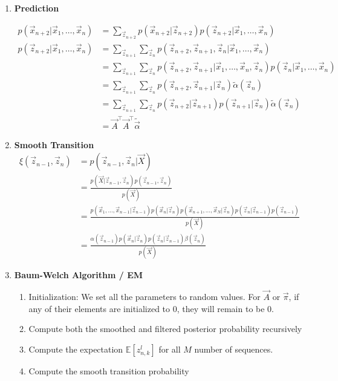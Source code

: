 \documentclass[12pt,twoside]{article}
\begin{document}
\begin{enumerate}
\item \textbf{Prediction}

	\begin{align*}
		p(\vec{x}_{n+2}\vert \vec{x}_1, \ldots, \vec{x}_n) &= \sum_{\vec{z}_{n+2}}p(\vec{x}_{n+2}\vert \vec{z}_{n+2})p(\vec{z}_{n+2}\vert \vec{x}_1,\ldots, \vec{x}_n)\\
		p(\vec{z}_{n+2}\vert \vec{x}_1,\ldots, \vec{x}_n) 
		& =  \sum_{\vec{z}_{n+1}}\sum_{\vec{z}_{n}} p(\vec{z}_{n+2},\vec{z}_{n+1},\vec{z}_{n}\vert \vec{x}_1, \ldots, \vec{x}_{n})\\
		& =  \sum_{\vec{z}_{n+1}}\sum_{\vec{z}_{n}} p(\vec{z}_{n+2},\vec{z}_{n+1} \vert \vec{x}_1, \ldots, \vec{x}_{n}, \vec{z}_{n})p(\vec{z}_{n}\vert \vec{x}_1, \ldots, \vec{x}_{n})\\
		& =  \sum_{\vec{z}_{n+1}}\sum_{\vec{z}_{n}} p(\vec{z}_{n+2},\vec{z}_{n+1} \vert \vec{z}_{n})\tilde{\alpha}(\vec{z}_n)\\
		& =  \sum_{\vec{z}_{n+1}}\sum_{\vec{z}_{n}} p(\vec{z}_{n+2}\vert \vec{z}_{n+1})p(\vec{z}_{n+1}\vert \vec{z}_{n})\tilde{\alpha}(\vec{z}_n)\\
		& = \vec{A}^\top\vec{A}^\top\tilde{\vec{\alpha}}
	\end{align*}	



\item \textbf{Smooth Transition}
	\begin{align*}
		\xi (\vec{z}_{n-1},\vec{z}_{n}) & = p(\vec{z}_{n-1},\vec{z}_{n} \vert \vec{X})\\
		&= \frac{p(\vec{X}\vert\vec{z}_{n-1},\vec{z}_{n})p(\vec{z}_{n-1},\vec{z}_{n})}{p(\vec{X})}\\
		&= \frac{p(\vec{x}_1,\ldots, \vec{x}_{n-1} \vert \vec{z}_{n-1})p(\vec{x}_n\vert \vec{z}_n)p(\vec{x}_{n+1},\ldots, \vec{x}_{N} \vert \vec{z}_{n})p(\vec{z}_n\vert \vec{z}_{n-1})p(\vec{z}	_{n-1})}{p(\vec{X})}\\
		&= \frac{\alpha(\vec{z}_{n-1}) p(\vec{x}_n\vert \vec{z}_n)p(\vec{z}_n\vert \vec{z}_{n-1})\beta(\vec{z}_n)}{p(\vec{X})}
	\end{align*}


\item \textbf{Baum-Welch Algorithm / EM }
\begin{enumerate}
	\item Initialization: We set all the parameters to random values. For $\vec{A}$ or $\vec{\pi}$, if any of their elements are initialized to 0, they will remain to be 0.
	\item Compute both the smoothed and filtered posterior probability recursively
	\item Compute the expectation $\mathbb{E} [z_{n,k}^l]$ for all $M$ number of sequences.
	\item Compute the smooth transition probability
\end{enumerate}



\end{enumerate}
\end{document}
